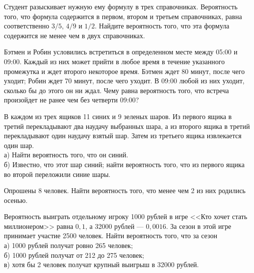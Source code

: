 \newpage\setcounter{zad}{0}



\begin{zkrW}{20}\noindent 
	Студент разыскивает нужную ему формулу в трех справочниках. Вероятность того, что формула содержится в первом, втором и третьем справочниках, равна соответственно $3/5$, $4/9$ и $1/2$. Найдите вероятность того, что эта формула содержится не менее чем в двух справочниках.
 
\end{zkrW}

\begin{zkrW}{20}\noindent 
	Бэтмен и Робин условились встретиться в определенном месте между 05:00 и 09:00. Каждый из них может прийти в любое время в течение указанного промежутка и ждет второго некоторое время. Бэтмен ждет 80 минут, после чего уходит; Робин ждет 70 минут, после чего уходит. В 09:00 любой из них уходит, сколько бы до этого он ни ждал. Чему равна вероятность того, что встреча произойдет не ранее чем без четверти 09:00?
 
\end{zkrW}

\begin{zkrW}{20}\noindent 
	В каждом из трех ящиков 11 синих и 9 зеленых шаров. Из первого ящика в третий перекладывают два наудачу выбранных шара, а из второго ящика в третий перекладывают один наудачу взятый шар. Затем из третьего ящика извлекается один шар. \\ \indent а) Найти вероятность того, что он синий. \\ \indent б) Известно, что этот шар синий; найти вероятность того, что из первого ящика во второй переложили синие шары.
 
\end{zkrW}

\begin{zkrW}{20}\noindent 
	Опрошены 8 человек. Найти вероятность того, что менее чем 2 из них родились осенью.
 
\end{zkrW}

\begin{zkrW}{20}\noindent 
	Вероятность выиграть отдельному игроку 1000 рублей в игре <<Кто хочет стать миллионером>> равна $0{,}1$, а 32000 рублей --- $0{,}0016$. За сезон в этой игре принимает участие 2500 человек. Найти вероятность того, что за сезон \\ \indent а) 1000 рублей получат ровно 265 человек; \\ \indent б) 1000 рублей получат от 212 до 275 человек; \\ \indent в) хотя бы 2 человек получат крупный выигрыш в 32000 рублей.
 
\end{zkrW}

